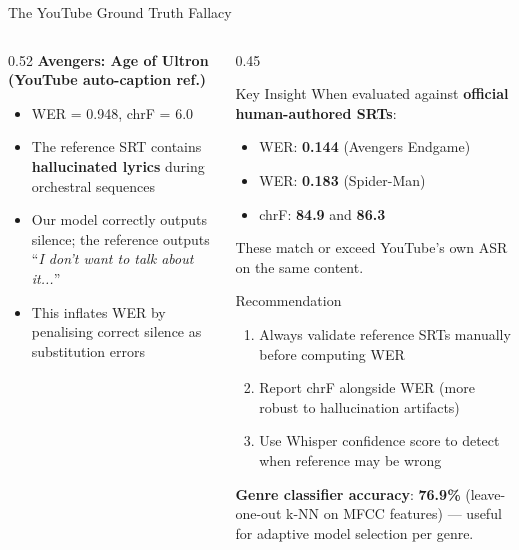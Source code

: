 \documentclass[aspectratio=169]{beamer}
\begin{document}
\begin{frame}{The YouTube Ground Truth Fallacy}
\begin{columns}[T]
\begin{column}{0.52\textwidth}
      \vspace{0.3cm}
      \textbf{Avengers: Age of Ultron (YouTube auto-caption ref.)}
      \begin{itemize}
        \item WER = 0.948, chrF = 6.0
        \item The reference SRT contains \textbf{hallucinated lyrics} during orchestral sequences
        \item Our model correctly outputs silence; the reference outputs ``\textit{I don't want to talk about it...}''
        \item This inflates WER by penalising correct silence as substitution errors
      \end{itemize}
    \end{column}
    \begin{column}{0.45\textwidth}
      \begin{alertblock}{Key Insight}
        When evaluated against \textbf{official human-authored SRTs}:
        \begin{itemize}
          \item WER: \textbf{0.144} (Avengers Endgame)
          \item WER: \textbf{0.183} (Spider-Man)
          \item chrF: \textbf{84.9} and \textbf{86.3}
        \end{itemize}
        These match or exceed YouTube's own ASR on the same content.
      \end{alertblock}
      \begin{block}{Recommendation}
        \begin{enumerate}
          \item Always validate reference SRTs manually before computing WER
          \item Report chrF alongside WER (more robust to hallucination artifacts)
          \item Use Whisper confidence score to detect when reference may be wrong
        \end{enumerate}
      \end{block}
      \vspace{0.2cm}
      \textbf{Genre classifier accuracy}: \textbf{76.9\%} (leave-one-out k-NN on MFCC features) — useful for adaptive model selection per genre.
    \end{column}
  \end{columns}
\end{frame}
\end{document}

